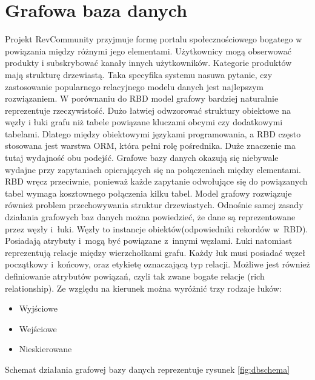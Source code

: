 \section{Grafowa baza danych}

Projekt RevCommunity przyjmuje formę portalu społecznościowego bogatego w powiązania między różnymi jego elementami. Użytkownicy mogą obserwować produkty i subskrybować kanały innych użytkowników. Kategorie produktów mają strukturę drzewiastą. Taka specyfika systemu nasuwa pytanie, czy zastosowanie popularnego relacyjnego modelu danych jest najlepszym rozwiązaniem. W porównaniu do RBD model grafowy bardziej naturalnie reprezentuje rzeczywistość. Dużo łatwiej odwzorować struktury obiektowe na węzły i łuki grafu niż tabele powiązane kluczami obcymi czy dodatkowymi tabelami. Dlatego między obiektowymi językami programowania, a RBD często stosowana jest warstwa ORM, która pełni rolę pośrednika. Duże znaczenie ma tutaj wydajność obu podejść. Grafowe bazy danych okazują się niebywale wydajne przy zapytaniach opierających się na połączeniach między elementami. RBD wręcz przeciwnie, ponieważ każde zapytanie odwołujące się do powiązanych tabel wymaga kosztownego połączenia kilku tabel. Model grafowy rozwiązuje również problem przechowywania struktur drzewiastych.
Odnośnie samej zasady działania grafowych baz danych można powiedzieć, że dane są reprezentowane przez węzły i~łuki. Węzły to instancje obiektów(odpowiedniki rekordów w~RBD). Posiadają atrybuty i~mogą być powiązane z~innymi węzłami. Łuki natomiast reprezentują relacje między wierzchołkami grafu. Każdy łuk musi posiadać węzeł początkowy i~końcowy, oraz etykietę oznaczającą typ relacji. Możliwe jest również definiowanie atrybutów powiązań, czyli tak zwane bogate relacje (rich relationship). Ze względu na kierunek można wyróżnić trzy rodzaje łuków:

\begin{itemize}
\item Wyjściowe
\item Wejściowe
\item Nieskierowane
\end{itemize}

\noindent
Schemat działania grafowej bazy danych reprezentuje rysunek \ref{fig:dbschema}

